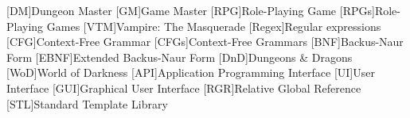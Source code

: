[DM]{Dungeon Master}
[GM]{Game Master}
[RPG]{Role-Playing Game}
[RPGs]{Role-Playing Games}
[VTM]{Vampire: The Masquerade}
[Regex]{Regular expressions}
[CFG]{Context-Free Grammar}
[CFGs]{Context-Free Grammars}
[BNF]{Backus-Naur Form}
[EBNF]{Extended Backus-Naur Form}
[DnD]{Dungeons \& Dragons}
[WoD]{World of Darkness}
[API]{Application Programming Interface}
[UI]{User Interface}
[GUI]{Graphical User Interface}
[RGR]{Relative Global Reference}
[STL]{Standard Template Library}
